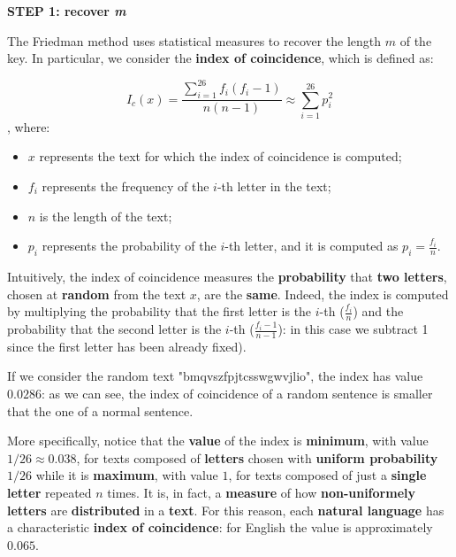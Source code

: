 \textbf{STEP 1: recover \textit{m}}

The Friedman method uses statistical measures to recover the length $m$ of the key. In particular, we consider the \textbf{index of coincidence}, which is defined as:

$$
I_c(x) = \frac{\sum_{i = 1}^{26} f_i (f_i - 1)}{n (n-1)} \approx \sum_{i = 1}^{26} p_i^2
$$
, where:

\begin{itemize}
    \item $x$ represents the text for which the index of coincidence is computed;
    \item $f_i$ represents the frequency of the $i$-th letter in the text;
    \item $n$ is the length of the text;
    \item $p_i$ represents the probability of the $i$-th letter, and it is computed as $p_i = \frac{f_i}{n}$.
\end{itemize}

Intuitively, the index of coincidence measures the \textbf{probability} that \textbf{two letters}, chosen at \textbf{random} from the text $x$, are the \textbf{same}. Indeed, the index is computed by multiplying the probability that the first letter is the $i$-th ($\frac{f_i}{n}$) and the probability that the second letter is the $i$-th ($\frac{f_i - 1}{n-1}$): in this case we subtract 1 since the first letter has been already fixed).


If we consider the random text "bmqvszfpjtcsswgwvjlio", the index has value $0.0286$: as we can see, the index of coincidence of a random sentence is smaller that the one of a normal sentence. 

More specifically, notice that the \textbf{value} of the index is \textbf{minimum}, with value $1/26 \approx 0.038$, for texts composed of \textbf{letters} chosen with \textbf{uniform probability} $1/26$ while it is \textbf{maximum}, with value $1$, for texts composed of just a \textbf{single letter} repeated $n$ times. It is, in fact, a \textbf{measure} of how \textbf{non-uniformely letters} are \textbf{distributed} in a \textbf{text}. For this reason, each \textbf{natural language} has a characteristic \textbf{index of coincidence}: for English the value is approximately $0.065$. 

